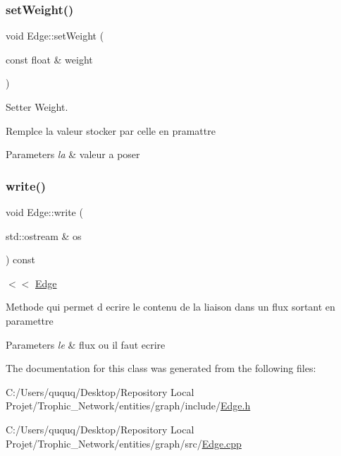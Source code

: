 \subsubsection{\texorpdfstring{set\+Weight()}{setWeight()}}
{\footnotesize\ttfamily void Edge\+::set\+Weight (\begin{DoxyParamCaption}\item[{const float \&}]{weight }\end{DoxyParamCaption})}



Setter Weight. 

Remplce la valeur stocker par celle en pramattre


\begin{DoxyParams}{Parameters}
{\em la} & valeur a poser \\
\hline
\end{DoxyParams}
\mbox{\label{class_edge_a51f56adcdff2231bf0d351c732278f74}} 
\subsubsection{\texorpdfstring{write()}{write()}}
{\footnotesize\ttfamily void Edge\+::write (\begin{DoxyParamCaption}\item[{std\+::ostream \&}]{os }\end{DoxyParamCaption}) const}



$<$$<$ \mbox{\hyperlink{class_edge}{Edge}} 

Methode qui permet d ecrire le contenu de la liaison dans un flux sortant en paramettre


\begin{DoxyParams}{Parameters}
{\em le} & flux ou il faut ecrire \\
\hline
\end{DoxyParams}


The documentation for this class was generated from the following files\+:\begin{DoxyCompactItemize}
\item 
C\+:/\+Users/ququq/\+Desktop/\+Repository Local Projet/\+Trophic\+\_\+\+Network/entities/graph/include/\mbox{\hyperlink{_edge_8h}{Edge.\+h}}\item 
C\+:/\+Users/ququq/\+Desktop/\+Repository Local Projet/\+Trophic\+\_\+\+Network/entities/graph/src/\mbox{\hyperlink{_edge_8cpp}{Edge.\+cpp}}\end{DoxyCompactItemize}
